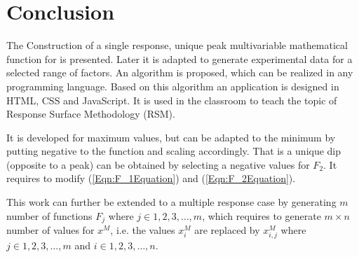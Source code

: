 \documentclass[twocolumn]{svjour3}          %
\begin{document}
\section{Conclusion}
\label{Sec:Conclusion}
The Construction of a single response, unique peak multivariable mathematical function for is presented. Later it is adapted to generate experimental data for a selected range of factors. An algorithm is proposed, which can be realized in any programming language. Based on this algorithm an application is designed in HTML, CSS and JavaScript. It is used in the classroom to teach the topic of Response Surface Methodology (RSM).
\par
It is developed for maximum values, but can be adapted to the minimum by putting negative to the function and scaling accordingly. That is a unique dip (opposite to a peak) can be obtained by selecting a negative values for $F_2$. It requires to modify (\ref{Eqn:F_1Equation}) and (\ref{Eqn:F_2Equation}).
\par
This work can further be extended to a multiple response case by generating $m$ number of functions $F_j$ where $j\in {1,2,3, \dots, m}$, which requires to generate $m\times n$ number of values for $x^M$, i.e. the values $x_{i}^M$ are replaced by $x_{i,j}^M$ where $j\in {1,2,3, \dots, m}$ and $i\in {1,2,3, \dots, n}$.



\end{document}
